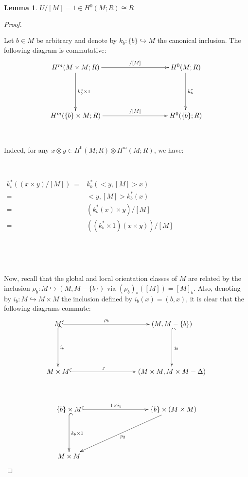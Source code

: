 \documentclass[12pt,oneside]{book}
\newtheorem{lem}    {Lemma}[chapter]
\newcommand{\tensor}{\otimes}
\begin{document}
    \begin{lem}\label{lema_tec_wu_2}
    	$U/[M]=1\in H^{0}(M;R)\cong R$
    \end{lem}

    \begin{proof}

        \

        Let $b\in M$ be arbitrary and denote by $k_{b}:\{b\}\hookrightarrow M$ the canonical inclusion. The following diagram is commutative:
        $$ \xymatrix @C=0.5cm {
        	H^{m}(M\times M;R) \ar[rrrrr]^-{/[M]} \ar[dd]^-{k_{b}^{*}\times 1} &&&&& H^{0}(M;R) \ar[dd]^-{k_{b}^{*}} \\
        	&&&&& \\
        	H^{m}(\{b\}\times M;R) \ar[rrrrr]^-{/[M]} &&&&& H^{0}(\{b\};R)
        }$$

        \
        
        Indeed, for any $x\tensor y\in H^{0}(M;R)\tensor H^{m}(M;R)$, we have:
        
        \

        $\begin{array}{rl}
        	k_{b}^{*}\left( (x\times y)/[M] \right) \ = & k_{b}^{*}\left( <y,[M]>x \right) \\
        	= & <y,[M]>k_{b}^{*}(x) \\
        	= & \left( k_{b}^{*}(x)\times y \right) /[M] \\
        	= & \left( (k_{b}^{*}\times 1)(x\times y) \right) /[M]
        \end{array}$

        \

        \

        Now, recall that the global and local orientation classes of $M$ are 
        related by the inclusion $\rho_{b}:M\hookrightarrow (M,M-\{b\})$ via $(\rho_{b})_{*}([M])=[M]_{b}$. Also, denoting by 
        $i_{b}:M\hookrightarrow M\times M$ the inclusion defined by $i_{b}(x)=(b,x)$, it is clear that the following diagrams commute:
        $$ \xymatrix @C=0.5cm {
        	M \ar@{^(->}[rrrrr]^-{\rho_{b}} \ar@{^(->}[dd]^-{i_{b}} &&&&& (M,M-\{b\}) \ar@{^(->}[dd]^-{j_{b}} \\
        	&&&&& \\
        	M\times M \ar@{^(->}[rrrrr]^-{j} &&&&& (M\times M,M\times M-\Delta)
        } $$

        \

        $$ \xymatrix @C=0.5cm {
        	\{b\}\times M \ar@{^(->}[rrrrr]^-{1\times i_{b}} \ar@{^(->}[dd]^-{k_{b}\times 1} &&&&& \{b\}\times (M\times M) \ar[llllldd]^-{p_{2}} \\
        	&&&&& \\
        	M\times M
        }$$


\end{proof}
\end{document}
